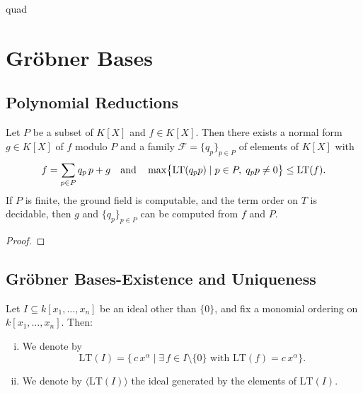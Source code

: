 quad\chapter{Gr{\"o}bner Bases} 

\section{Polynomial Reductions}

\begin{theorem}
\label{thm:div_alg}
  \leanok
  Let $P$ be a subset of $K[X]$ and $f\in K[X]$.
  Then there exists a normal form $g\in K[X]$ of $f$ modulo $P$ and a family $\mathcal{F}=\{q_{p}\}_{p\in P}$ of elements of $K[X]$ with
  \[
    f=\sum_{p\in P}q_{p}\,p + g
    \quad\text{and}\quad
    \max\bigl\{\operatorname{LT}(q_{p}p)\mid p\in P,\;q_{p}p\neq 0\bigr\}\le \operatorname{LT}(f).
  \]
  If $P$ is finite, the ground field is computable, and the term order on $T$ is decidable, 
  then $g$ and $\{q_{p}\}_{p\in P}$ can be computed from $f$ and $P$.
\end{theorem}
\begin{proof}
  \leanok %
\end{proof}

\section{Gr{\"o}bner Bases-Existence and Uniqueness}

\begin{definition}
  \label{def:initialIdeal}
  \leanok %
  Let \(I\subseteq k[x_1,\dots,x_n]\) be an ideal other than \(\{0\}\), and fix a monomial ordering on \(k[x_1,\dots,x_n]\).  Then:
  \begin{enumerate}[(i)]
    \item We denote by
    \[
      \mathrm{LT}(I)
      =
      \{\,c\,x^\alpha \mid \exists\,f\in I\setminus\{0\}\text{ with }\mathrm{LT}(f)=c\,x^\alpha\}.
    \]
    \item We denote by \(\langle \mathrm{LT}(I)\rangle\) the ideal generated by the elements of \(\mathrm{LT}(I)\).
  \end{enumerate}
\end{definition}


